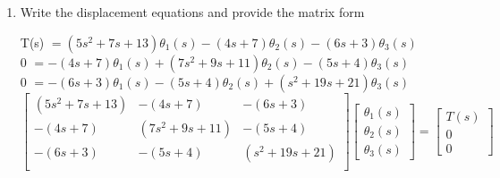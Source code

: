 \begin{fold}
\begin{enumerate}[label=(\alph*),itemindent=*,leftmargin=*,nolistsep]
\begin{center}
$\sum T_0 = 0 \quad\text{(clockwise, +)}$ \\[6pt]
$0 = (6s+3)\theta_1(s) + (5s+4)\theta_2(s) - (s^2+19s+21)\theta_3(s)$ \\[6pt]
$0 = -(6s+3)\theta_1(s) - (5s+4)\theta_2(s) + (s^2+19s+21)\theta_3(s)$
\end{center}

\vspace{15pt}
\item Write the displacement equations and provide the matrix form
\begin{center}
T(s) $= (5s^2 + 7s + 13)\theta_1(s) - (4s + 7)\theta_2(s) - (6s + 3)\theta_3(s)$\\
0 $= -(4s + 7)\theta_1(s) +(7s^2 + 9s + 11)\theta_2(s) - (5s + 4)\theta_3(s)$\\
0 $= -(6s + 3)\theta_1(s) - (5s + 4)\theta_2(s) + (s^2 + 19s + 21)\theta_3(s)$\\
\[
\begin{bmatrix}
(5s^2 + 7s + 13) & -(4s + 7) & -(6s + 3)\\
-(4s + 7) & (7s^2 + 9s + 11) & -(5s + 4)\\
-(6s + 3) & -(5s + 4) & (s^2 + 19s + 21)\\
\end{bmatrix}
\begin{bmatrix}
\theta_1(s) \\
\theta_2(s) \\
\theta_3(s)
\end{bmatrix}
=
\begin{bmatrix}
T(s)\\
0\\
0
\end{bmatrix}
\]
\end{center}

\end{enumerate}



\end{fold}
